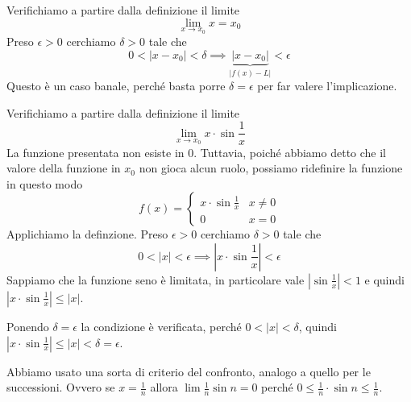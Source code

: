 \begin{example}
Verifichiamo a partire dalla definizione il limite
\begin{equation*}
\lim_{x \to x_0} x = x_0
\end{equation*}
Preso $\epsilon > 0$ cerchiamo $\delta > 0$ tale che
\begin{equation*}
0 < |x - x_0| < \delta \implies \underbrace{|x-x_0|}_{|f(x)-L|} < \epsilon
\end{equation*}
Questo è un caso banale, perché basta porre $\delta = \epsilon$ per far valere l'implicazione.
\end{example}

\begin{example}
Verifichiamo a partire dalla definizione il limite
\begin{equation*}
\lim_{x \to x_0} x \cdot \sin \frac{1}{x}
\end{equation*}
La funzione presentata non esiste in 0. Tuttavia, poiché abbiamo detto che il valore della funzione in $x_0$ non gioca alcun ruolo, possiamo ridefinire la funzione in questo modo
\begin{equation*}
f(x) = \begin{cases}
x \cdot \sin \frac{1}{x} & x \neq 0 \\
0 & x = 0
\end{cases}
\end{equation*}
Applichiamo la definzione. Preso $\epsilon > 0$ cerchiamo $\delta > 0$ tale che
\begin{equation*}
0 < |x| < \epsilon \implies \left\lvert x \cdot \sin \frac{1}{x} \right\rvert < \epsilon
\end{equation*}
Sappiamo che la funzione seno è limitata, in particolare vale $|\sin \frac{1}{x}| < 1$ e quindi $|x \cdot \sin \frac{1}{x}| \le |x|$.

Ponendo $\delta = \epsilon$ la condizione è verificata, perché $0 < |x| < \delta$, quindi $|x \cdot \sin \frac{1}{x}| \le |x| < \delta = \epsilon$.

Abbiamo usato una sorta di criterio del confronto, analogo a quello per le successioni. Ovvero se $x = \frac{1}{n}$ allora $\lim \frac{1}{n} \sin n = 0$ perché $0 \le \frac{1}{n} \cdot \sin n \le \frac{1}{n}$.
\end{example}

